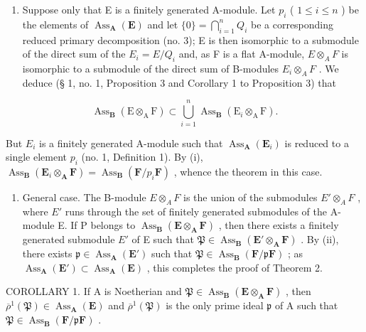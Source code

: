 \begin{enumerate}
\def\labelenumi{(\roman{enumi})}
\setcounter{enumi}{1}
\tightlist
\item
  Suppose only that E is a finitely generated A-module. Let \(p_{i}\) ( \(1 \leqslant i \leqslant n\) ) be the elements of \(\operatorname{Ass}_{\mathbf{A}}(\mathbf{E})\) and let \(\{0\} = \bigcap_{i=1}^{n} Q_{i}\) be a corresponding reduced primary decomposition (no. 3); E is then isomorphic to a submodule of the direct sum of the \(E_{i} = E/Q_{i}\) and, as F is a flat A-module, \(E \otimes_{A} F\) is isomorphic to a submodule of the direct sum of B-modules \(E_{i} \otimes_{A} F\) . We deduce (§ 1, no. 1, Proposition 3 and Corollary 1 to Proposition 3) that
\end{enumerate}

\[
\operatorname{Ass} _ {\mathbf {B}} (\mathrm{E} \otimes_ {\mathrm{A}} \mathrm{F}) \subset \bigcup_ {i = 1} ^ {n} \operatorname{Ass} _ {\mathbf {B}} (\mathrm{E} _ {i} \otimes_ {\mathrm{A}} \mathrm{F}).
\]

But \(E_{i}\) is a finitely generated A-module such that \(\operatorname{Ass}_{\mathbf{A}}(\mathbf{E}_{i})\) is reduced to a single element \(p_{i}\) (no. 1, Definition 1). By (i), \(\operatorname{Ass}_{\mathbf{B}}(\mathbf{E}_{i} \otimes_{\mathbf{A}} \mathbf{F}) = \operatorname{Ass}_{\mathbf{B}}(\mathbf{F}/p_{i}\mathbf{F})\) , whence the theorem in this case.

\begin{enumerate}
\def\labelenumi{(\roman{enumi})}
\setcounter{enumi}{2}
\tightlist
\item
  General case. The B-module \(E \otimes_{A} F\) is the union of the submodules \(E' \otimes_{A} F\) , where \(E'\) runs through the set of finitely generated submodules of the A-module E. If P belongs to \(\operatorname{Ass}_{\mathbf{B}}(\mathbf{E} \otimes_{\mathbf{A}} \mathbf{F})\) , then there exists a finitely generated submodule \(E'\) of E such that \(\mathfrak{P} \in \operatorname{Ass}_{\mathbf{B}}(\mathbf{E}' \otimes_{\mathbf{A}} \mathbf{F})\) . By (ii), there exists \(\mathfrak{p} \in \operatorname{Ass}_{\mathbf{A}}(\mathbf{E}')\) such that \(\mathfrak{P} \in \operatorname{Ass}_{\mathbf{B}}(\mathbf{F}/\mathfrak{p}\mathbf{F})\) ; as \(\operatorname{Ass}_{\mathbf{A}}(\mathbf{E}') \subset \operatorname{Ass}_{\mathbf{A}}(\mathbf{E})\) , this completes the proof of Theorem 2.
\end{enumerate}

COROLLARY 1. If A is Noetherian and \(\mathfrak{P} \in \operatorname{Ass}_{\mathbf{B}}(\mathbf{E} \otimes_{\mathbf{A}} \mathbf{F})\) , then \(\overline{\rho}^{1}(\mathfrak{P}) \in \operatorname{Ass}_{\mathbf{A}}(\mathbf{E})\) and \(\overline{\rho}^{1}(\mathfrak{P})\) is the only prime ideal \(\mathfrak{p}\) of A such that \(\mathfrak{P} \in \operatorname{Ass}_{\mathbf{B}}(\mathbf{F}/\mathfrak{p}\mathbf{F})\) .

